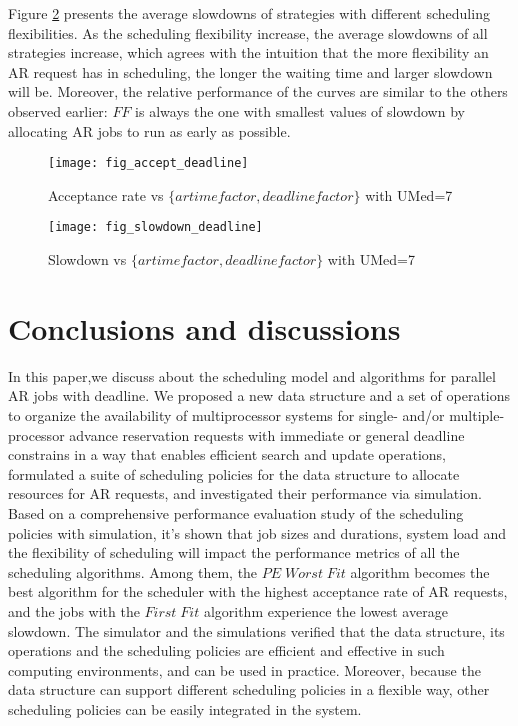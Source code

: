 \documentclass[preprint,12pt]{elsarticle}
\begin{document}
Figure \ref{fig:slowdown3} presents the average slowdowns of strategies with different scheduling flexibilities. As the scheduling flexibility increase, the average slowdowns of all strategies increase, which agrees with the intuition that the more flexibility an AR request has in scheduling, the longer the waiting time and larger slowdown will be.  Moreover, the relative performance of the curves are similar to the others observed earlier: $FF$ is always the one with smallest values of slowdown by allocating AR jobs to run as early as possible.


\begin{figure}[htp]
\centering
\texttt{[image: fig\_accept\_deadline]}
\caption{Acceptance rate vs $\{artime factor, deadline factor\}$ with UMed=7}
\label{fig:accept3}
\end{figure}

\begin{figure}[htp]
\centering
\texttt{[image: fig\_slowdown\_deadline]}
\caption{Slowdown vs $\{artime factor, deadline factor\}$ with UMed=7}
\label{fig:slowdown3}
\end{figure}



\section{Conclusions and discussions}
\label{conclusion}

In this paper,we discuss about the scheduling model and algorithms for parallel AR jobs with deadline. We proposed a new data structure and a set of operations to organize the availability of multiprocessor systems for single- and/or multiple-processor advance reservation requests with immediate or general deadline constrains in a way that enables efficient search and update operations, formulated a suite of scheduling policies for the data structure to allocate resources for AR requests, and investigated their performance via simulation.
Based on a comprehensive performance evaluation study of the scheduling policies with simulation, it's shown that job sizes and durations, system load and the flexibility of scheduling will impact the performance metrics of all the scheduling algorithms. Among them, the $PE\; Worst\; Fit$ algorithm becomes the best algorithm for the scheduler with the highest acceptance rate of AR requests, and the jobs with the $First\; Fit$ algorithm experience the lowest average slowdown. The simulator and the simulations verified that the data structure, its operations and the scheduling policies are efficient and effective in such computing environments, and can be used in practice. Moreover, because the data structure can support different scheduling policies in a flexible way, other scheduling policies can be easily integrated in the system.
\end{document}
